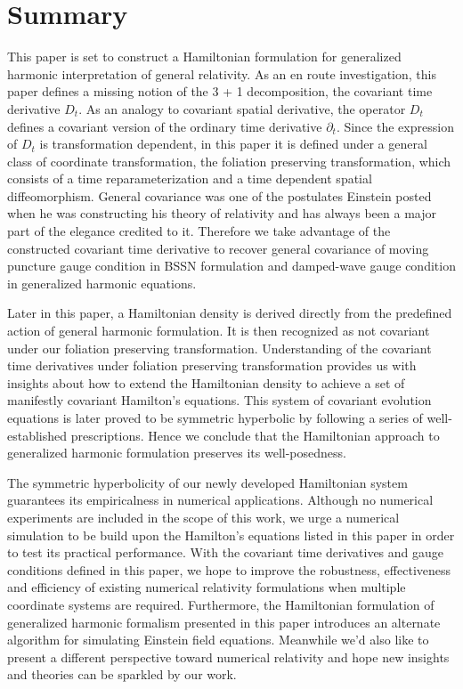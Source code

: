 \chapter{Summary}\label{summary}
This paper is set to construct a Hamiltonian formulation for generalized harmonic interpretation of general relativity. As an en route investigation, this paper defines a missing notion of the 3 + 1 decomposition, the covariant time derivative $D_{t}$. As an analogy to covariant spatial derivative, the operator $D_{t}$ defines a covariant version of the ordinary time derivative $\partial_{t}$. Since the expression of $D_{t}$ is transformation dependent, in this paper it is defined under a general class of coordinate transformation, the foliation preserving transformation, which consists of a time reparameterization and a time dependent spatial diffeomorphism. General covariance was one of the postulates Einstein posted when he was constructing his theory of relativity and has always been a major part of the elegance credited to it. Therefore we take advantage of the constructed covariant time derivative to recover general covariance of moving puncture gauge condition in BSSN formulation and damped-wave gauge condition in generalized harmonic equations. 

Later in this paper, a Hamiltonian density is derived directly from the predefined action of general harmonic formulation. It is then recognized as not covariant under our foliation preserving transformation. Understanding of the covariant time derivatives under foliation preserving transformation provides us with insights about how to extend the Hamiltonian density to achieve a set of manifestly covariant Hamilton's equations. This system of covariant evolution equations is later proved to be symmetric hyperbolic by following a series of well-established prescriptions. Hence we conclude that the Hamiltonian approach to generalized harmonic formulation preserves its well-posedness. 

The symmetric hyperbolicity of our newly developed Hamiltonian system guarantees its empiricalness in numerical applications. Although no numerical experiments are included in the scope of this work, we urge a numerical simulation to be build upon the Hamilton's equations listed in this paper in order to test its practical performance. With the covariant time derivatives and gauge conditions defined in this paper, we hope to improve the robustness, effectiveness and efficiency of existing numerical relativity formulations when multiple coordinate systems are required. Furthermore, the Hamiltonian formulation of generalized harmonic formalism presented in this paper introduces an alternate algorithm for simulating Einstein field equations. Meanwhile we'd also like to present a different perspective toward numerical relativity and hope new insights and theories can be sparkled by our work. 